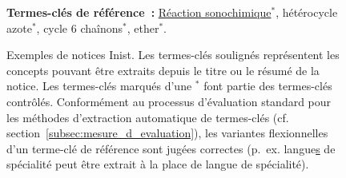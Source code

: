\begin{figure}
\begin{minipage}{\linewidth}
{{          \vspace{-0.5em}
          \textbf{Termes-clés de référence~:} \underline{Réaction
          sonochimique$^*$}, hétérocycle azote$^*$, cycle 6 chaînons$^*$,
          ether$^*$.
        }
      }
    \end{minipage}
    \caption{Exemples de notices Inist. Les termes-clés soulignés représentent
             les concepts pouvant être extraits depuis le titre ou le résumé de
             la notice. Les termes-clés marqués d'une $^*$ font partie des
             termes-clés contrôlés. Conformément au processus d'évaluation
             standard pour les méthodes d'extraction automatique de termes-clés
             (cf. section~\ref{subsec:mesure_d_evaluation}), les variantes
             flexionnelles d'un terme-clé de référence sont jugées correctes
             (p.~ex. \og{}langue\underline{s} de  spécialité\fg{} peut être
             extrait à la place de \og{}langue de spécialité\fg{}).
             \label{fig:exemple_notice_inist}}
  \end{figure}


